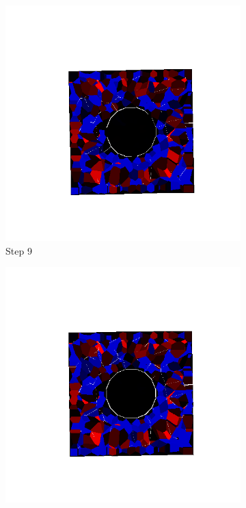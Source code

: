 \begin{figure}[ht!]
      \begin{subfigure}{.25\textwidth}
        \centering
        \includegraphics[width=1.0\linewidth]{Files/Small_DEF/IS/DEP5-STEP(009).png}
      \caption{Step 9}
      \end{subfigure}%
      \begin{subfigure}{.25\textwidth}
        \centering
        \includegraphics[width=1.0\linewidth]{Files/Small_DEF/IS/DEP5-STEP(010).png}

\end{subfigure}
\end{figure}
